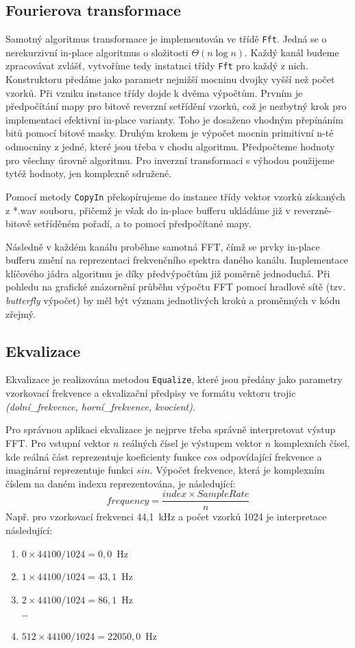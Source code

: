 \documentclass[11pt]{article} %
\begin{document}
\subsection{Fourierova transformace}
Samotný algoritmus transformace je implementován ve třídě \texttt{Fft}. Jedná se o nerekurzivní in-place algoritmus o složitosti $\Theta(n \log n)$. Každý kanál budeme zpracovávat zvlášť, vytvoříme tedy instatnci třídy \texttt{Fft} pro každý z nich. Konstruktoru předáme jako parametr nejnižší mocninu dvojky vyšší než počet vzorků. Při vzniku instance třídy dojde k dvěma výpočtům. Prvním je předpočítání mapy pro bitově reverzní setřídění vzorků, což je nezbytný krok pro implementaci efektivní in-place varianty. Toho je dosaženo vhodným přepínáním bitů pomocí bitové masky. Druhým krokem je výpočet mocnin primitivní n-té odmocniny z jedné, které jsou třeba v chodu algoritmu. Předpočteme hodnoty pro všechny úrovně algoritmu. Pro inverzní transformaci s výhodou použijeme tytéž hodnoty, jen komplexně sdružené.

Pomocí metody \texttt{CopyIn} překopírujeme do instance třídy vektor vzorků získaných z *.wav souboru, přičemž je však do in-place bufferu ukládáme již v reverzně-bitově setříděném pořadí, a to pomocí předpočítané mapy.

Následně v každém kanálu proběhne samotná FFT, čímž se prvky in-place bufferu změní na reprezentaci frekvenčního spektra daného kanálu. Implementace klíčového jádra algoritmu je díky předvýpočtům již poměrně jednoduchá. Při pohledu na grafické znázornění průběhu výpočtu FFT pomocí hradlové sítě (tzv. \emph{butterfly} výpočet) by měl být význam jednotlivých kroků a proměnných v kódu zřejmý.
\subsection{Ekvalizace}
Ekvalizace je realizována metodou \texttt{Equalize}, které jsou předány jako parametry vzorkovací frekvence a ekvalizační předpisy ve formátu vektoru trojic \emph{(dolní\_frekvence, horní\_frekvence, kvocient)}. 

Pro správnou aplikaci ekvalizace je nejprve třeba správně interpretovat výstup FFT. Pro vstupní vektor $n$ reálných čísel je výstupem vektor $n$ komplexních čísel, kde reálná část reprezentuje koeficienty funkce $cos$ odpovídající frekvence a imaginární reprezentuje funkci $sin$. Výpočet frekvence, která je komplexním číslem na daném indexu reprezentována, je následující:
$$frequency = \frac{index \times SampleRate}{n}$$
Např. pro vzorkovací frekvenci 44,1~kHz a počet vzorků 1024 je interpretace následující:
\begin{enumerate}
 pt
\setcounter{enumi}{-1}
\item  $0 \times 44100 / 1024 = 0,0$~Hz
\item  $1 \times 44100 / 1024 = 43,1$~Hz
\item  $2 \times 44100 / 1024 = 86,1$~Hz \\
\ldots
\setcounter{enumi}{511}
\item  $512 \times 44100 / 1024 = 22050,0$~Hz
\end{enumerate}
\end{document}
